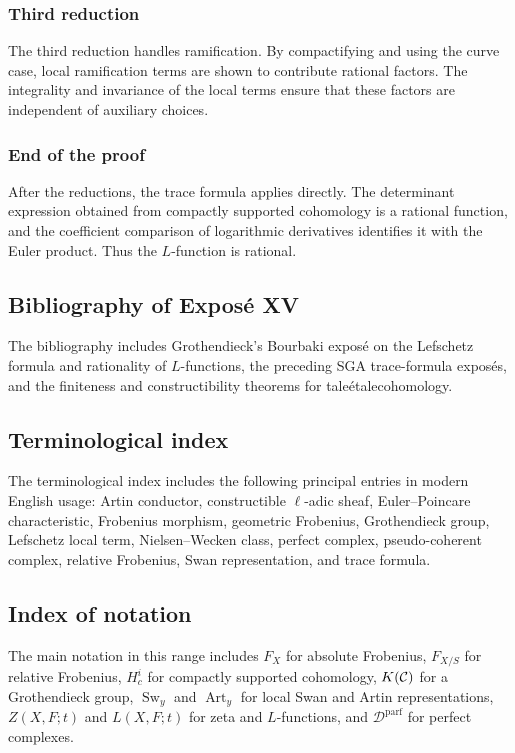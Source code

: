 \documentclass[11pt]{article}
\theoremstyle{plain}
\theoremstyle{definition}
\theoremstyle{remark}
\newcommand{\D}{\mathcal D}\newcommand{\E}{\mathcal E}\newcommand{\F}{\mathcal F}
\providecommand{\etale}{\ifmmode\acute{e}tale\else \'etale\fi}
\providecommand{\Sw}{\operatorname{Sw}}
\providecommand{\Art}{\operatorname{Art}}
\begin{document}
\subsubsection*{Third reduction}

The third reduction handles ramification. By compactifying and using the curve case, local ramification terms are shown to contribute rational factors. The integrality and invariance of the local terms ensure that these factors are independent of auxiliary choices.

\subsubsection*{End of the proof}

After the reductions, the trace formula applies directly. The determinant expression obtained from compactly supported cohomology is a rational function, and the coefficient comparison of logarithmic derivatives identifies it with the Euler product. Thus the $L$-function is rational.

\subsection*{Bibliography of Expos\'e XV}

The bibliography includes Grothendieck's Bourbaki expos\'e on the Lefschetz formula and rationality of $L$-functions, the preceding SGA trace-formula expos\'es, and the finiteness and constructibility theorems for \etale cohomology.

\subsection*{Terminological index}

The terminological index includes the following principal entries in modern English usage: Artin conductor, constructible $\ell$-adic sheaf, Euler--Poincare characteristic, Frobenius morphism, geometric Frobenius, Grothendieck group, Lefschetz local term, Nielsen--Wecken class, perfect complex, pseudo-coherent complex, relative Frobenius, Swan representation, and trace formula.

\subsection*{Index of notation}

The main notation in this range includes $F_X$ for absolute Frobenius, $F_{X/S}$ for relative Frobenius, $H^i_c$ for compactly supported cohomology, $K(\mathcal C)$ for a Grothendieck group, $\Sw_y$ and $\Art_y$ for local Swan and Artin representations, $Z(X,F;t)$ and $L(X,F;t)$ for zeta and $L$-functions, and $\D^{\mathrm{parf}}$ for perfect complexes.
\end{document}
